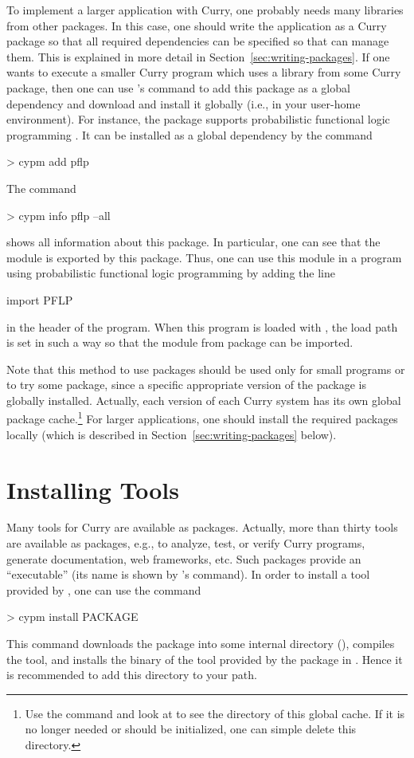 To implement a larger application with Curry,
one probably needs many libraries
from other packages.
In this case, one should write the application as a Curry package
so that all required dependencies can be specified
so that \cpm can manage them.
This is explained in more detail in Section~\ref{sec:writing-packages}.
If one wants to execute a smaller Curry program
which uses a library from some Curry package,
then one can use \cpm's  command
to add this package as a global dependency and
download and install it globally (i.e., in your user-home environment).
For instance, the package  supports
probabilistic functional logic programming
\cite{ChristiansenDylusTeegen18}.
It can be installed as a global dependency by the command
%
\begin{prog}
> cypm add pflp
\end{prog}
%
The command
%
\begin{prog}
> cypm info pflp --all
\end{prog}
%
shows all information about this package.
In particular, one can see that the module 
is exported by this package.
Thus, one can use this module in a program
using probabilistic functional logic programming by adding the line
%
\begin{prog}
import PFLP
\end{prog}
%
in the header of the program.
When this program is loaded with \pakcs,
the load path is set in such a way so that
the module  from package 
can be imported.

Note that this method to use packages should be used only
for small programs or to try some package,
since a specific appropriate version of the package is globally installed.
Actually, each version of each Curry system
has its own global package cache.\footnote{%
Use the command  and look at 
to see the directory of this global cache.
If it is no longer needed or should be initialized,
one can simple delete this directory.}
For larger applications, one should install the required packages
locally (which is described in Section~\ref{sec:writing-packages} below).


\section{Installing Tools}
\label{sec:installing-tools}

Many tools for Curry are available as packages.
Actually, more than thirty tools are available as packages,
e.g., to analyze, test, or verify Curry programs,
generate documentation, web frameworks, etc.
Such packages provide an ``executable'' (its name is shown
by \cpm's  command).
In order to install a tool provided by ,
one can use the command
%
\begin{prog}
> cypm install PACKAGE
\end{prog}
%
This command downloads the package into some internal directory
(), compiles the tool,
and installs the binary of the tool provided by the package
in .
Hence it is recommended to add this directory to your path.

